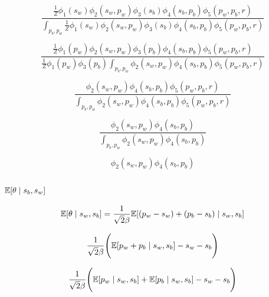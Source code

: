 \documentclass[a4paper,11pt]{article}
\theoremstyle{mytheor}
\newcommand{\E}{\Bbb{E}}
\begin{document}
\begin{equation}
    \label{eq:chain_rule_1}
    \frac{\frac{1}{Z}\phi_{1}(s_w)\phi_{2}(s_w,p_w)\phi_{3}(s_b)\phi_{4}(s_b,p_b)\phi_{5}(p_w,p_b,r)}{\int_{p_b,p_w}\frac{1}{Z}\phi_{1}(s_w)\phi_{2}(s_w,p_w)\phi_{3}(s_b)\phi_{4}(s_b,p_b)\phi_{5}(p_w,p_b,r)}
\end{equation}

\begin{equation}
    \label{eq:chain_rule_2}
    \frac{\frac{1}{Z}\phi_{1}(p_w)\phi_{2}(s_w,p_w)\phi_{3}(p_b)\phi_{4}(s_b,p_b)\phi_{5}(p_w,p_b,r)}{\frac{1}{Z}\phi_{1}(p_w)\phi_{3}(p_b)\int_{p_b,p_w}\phi_{2}(s_w,p_w)\phi_{4}(s_b,p_b)\phi_{5}(p_w,p_b,r)}
\end{equation}

\begin{equation}
    \label{eq:chain_rule_3}
    \frac{\phi_{2}(s_w,p_w)\phi_{4}(s_b,p_b)\phi_{5}(p_w,p_b,r)}{\int_{p_b,p_w}\phi_{2}(s_w,p_w)\phi_{4}(s_b,p_b)\phi_{5}(p_w,p_b,r)}
\end{equation}

\begin{equation}
    \label{eq:chain_rule_4}
    \frac{\phi_{2}(s_w,p_w)\phi_{4}(s_b,p_b)}{\int_{p_b,p_w}\phi_{2}(s_w,p_w)\phi_{4}(s_b,p_b)}
\end{equation}

\begin{equation}
    \label{eq:chain_rule_5}
    \phi_{2}(s_w,p_w)\phi_{4}(s_b,p_b)
\end{equation}

\subsection{}
\subsubsection{$\E[\theta \mid s_b,s_w]$}

\begin{equation}
    \label{e_theta}
    \Bbb{E}[\theta\mid s_w,s_b] = \frac{1}{\sqrt{2}\beta}\Bbb{E}[(p_w-s_w)+(p_b-s_b) \mid s_w,s_b]
\end{equation}

\begin{equation}
    \label{e_theta_2}
    \frac{1}{\sqrt{2}\beta} \Bigg( \Bbb{E}[p_w+p_b \mid s_w,s_b]-s_w-s_b \Bigg)
\end{equation}

\begin{equation}
    \label{e_theta_3}
    \frac{1}{\sqrt{2}\beta} \Bigg( \Bbb{E}[p_w\mid s_w,s_b] + \Bbb{E}[p_b \mid s_w,s_b]-s_w-s_b \Bigg)
\end{equation}
\end{document}
